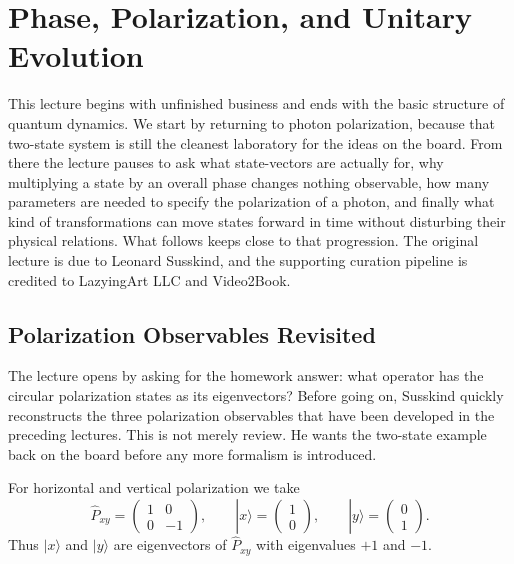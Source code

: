 \chapter{Phase, Polarization, and Unitary Evolution}

This lecture begins with unfinished business and ends with the basic structure of quantum dynamics. We start by returning to photon polarization, because that two-state system is still the cleanest laboratory for the ideas on the board. From there the lecture pauses to ask what state-vectors are actually for, why multiplying a state by an overall phase changes nothing observable, how many parameters are needed to specify the polarization of a photon, and finally what kind of transformations can move states forward in time without disturbing their physical relations. What follows keeps close to that progression. The original lecture is due to Leonard Susskind, and the supporting curation pipeline is credited to LazyingArt LLC and Video2Book.

\section{Polarization Observables Revisited}

The lecture opens by asking for the homework answer: what operator has the circular polarization states as its eigenvectors? Before going on, Susskind quickly reconstructs the three polarization observables that have been developed in the preceding lectures. This is not merely review. He wants the two-state example back on the board before any more formalism is introduced.

For horizontal and vertical polarization we take
\begin{equation}
\hat P_{xy}=
\begin{pmatrix}
1&0\\
0&-1
\end{pmatrix},
\qquad
|x\rangle=
\begin{pmatrix}
1\\
0
\end{pmatrix},
\qquad
|y\rangle=
\begin{pmatrix}
0\\
1
\end{pmatrix}.
\end{equation}
Thus $|x\rangle$ and $|y\rangle$ are eigenvectors of $\hat P_{xy}$ with eigenvalues $+1$ and $-1$.

